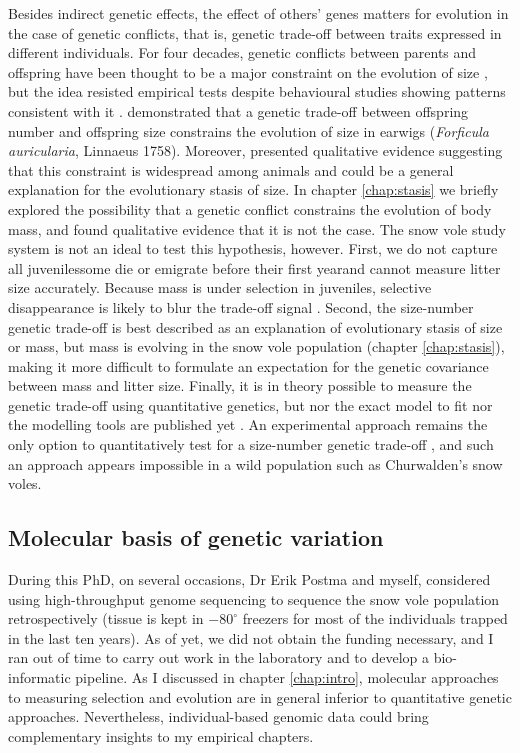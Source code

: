 Besides indirect genetic effects, the effect of others' genes matters for evolution in the case of genetic conflicts, that is, genetic trade-off between traits expressed in different individuals.
For four decades, genetic conflicts between parents and offspring have been thought to be a major constraint on the evolution of size \parencite[since][]{Trivers1974}, but the idea resisted empirical tests despite behavioural studies showing patterns consistent with it \parencite{Kolliker2015}. \cite{Kolliker2015} demonstrated that a genetic trade-off between offspring number and offspring size constrains the evolution of size in earwigs (\textit{Forficula auricularia}, Linnaeus 1758). Moreover, \cite{Rollinson2015b} presented qualitative evidence suggesting that this constraint is widespread among animals and could be a general explanation for the evolutionary stasis of size. 
In chapter \ref{chap:stasis} we briefly explored the possibility that a genetic conflict constrains the evolution of body mass, and found qualitative evidence that it is not the case. The snow vole study system is not an ideal to test this hypothesis, however. First, we do not capture all juveniles\textemdash some die or emigrate before their first year\textemdash and cannot measure litter size accurately. Because mass is under selection in juveniles, selective disappearance is likely to blur the trade-off signal \parencite{Hadfield2011}. Second, the size-number genetic trade-off is best described as an explanation of evolutionary stasis of size or mass, but mass is evolving in the snow vole population (chapter \ref{chap:stasis}), making it more difficult to formulate an expectation for the genetic covariance between mass and litter size. 
Finally, it is in theory possible to measure the genetic trade-off using quantitative genetics, but nor the exact model to fit nor the modelling tools are published yet \parencite{Hadfield2012, Rollinson2015b}. An experimental approach remains the only option to quantitatively test for a size-number genetic trade-off \parencite{Kolliker2015}, and such an approach appears impossible in a wild population such as Churwalden's snow voles. 

\subsection{Molecular basis of genetic variation}
During this PhD, on several occasions, Dr Erik Postma and myself, considered using high-throughput genome sequencing \parencite{VanDijk2014} to sequence the snow vole population retrospectively (tissue is kept in $-80^\circ$ freezers for most of the individuals trapped in the last ten years).
As of yet, we did not obtain the funding necessary, and I ran out of time to carry out work in the laboratory and to develop a bio-informatic pipeline. 
As I discussed in chapter \ref{chap:intro}, molecular approaches to measuring selection and evolution are in general inferior to quantitative genetic approaches. Nevertheless, individual-based genomic data could bring complementary insights to my empirical chapters.

